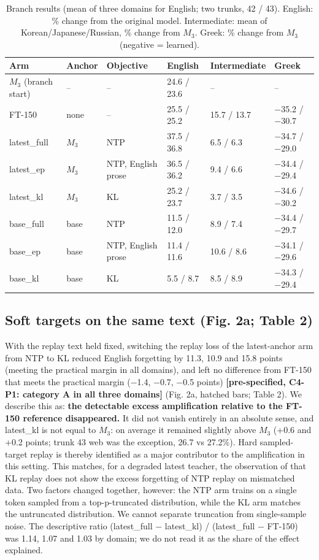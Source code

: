 \documentclass[11pt]{article}
\begin{document}
\begin{table}[t]
\centering
\small
\caption{Branch results (mean of three domains for English; two trunks, 42 / 43). English: \% change from the original model. Intermediate: mean of Korean/Japanese/Russian, \% change from $M_3$. Greek: \% change from $M_3$ (negative = learned).}
\label{tab:2}
\begin{tabular}{llllll}
\toprule
\textbf{Arm} & \textbf{Anchor} & \textbf{Objective} & \textbf{English} & \textbf{Intermediate} & \textbf{Greek} \\
\midrule
$M_3$ (branch start) & – & – & 24.6 / 23.6 & – & – \\
FT-150 & none & – & 25.5 / 25.2 & 15.7 / 13.7 & −35.2 / −30.7 \\
latest\_full & $M_3$ & NTP & 37.5 / 36.8 & 6.5 / 6.3 & −34.7 / −29.0 \\
latest\_ep & $M_3$ & NTP, English prose & 36.5 / 36.2 & 9.4 / 6.6 & −34.4 / −29.4 \\
latest\_kl & $M_3$ & KL & 25.2 / 23.7 & 3.7 / 3.5 & −34.6 / −30.2 \\
base\_full & base & NTP & 11.5 / 12.0 & 8.9 / 7.4 & −34.4 / −29.7 \\
base\_ep & base & NTP, English prose & 11.4 / 11.6 & 10.6 / 8.6 & −34.1 / −29.6 \\
base\_kl & base & KL & 5.5 / 8.7 & 8.5 / 8.9 & −34.3 / −29.4 \\
\bottomrule
\end{tabular}
\end{table}

\subsection{Soft targets on the same text (Fig. 2a; Table 2)}

With the replay text held fixed, switching the replay loss of the latest-anchor arm from NTP to KL reduced English forgetting by 11.3, 10.9 and 15.8 points (meeting the practical margin in all domains), and left no difference from FT-150 that meets the practical margin (−1.4, −0.7, −0.5 points) \textbf{[pre-specified, C4-P1: category A in all three domains]} (Fig. 2a, hatched bars; Table 2). We describe this as: \textbf{the detectable excess amplification relative to the FT-150 reference disappeared.} It did not vanish entirely in an absolute sense, and latest\_kl is not equal to $M_3$: on average it remained slightly above $M_3$ (+0.6 and +0.2 points; trunk 43 web was the exception, 26.7 vs 27.2\%). Hard sampled-target replay is thereby identified as a major contributor to the amplification in this setting. This matches, for a degraded latest teacher, the observation of \citet{marek2026} that KL replay does not show the excess forgetting of NTP replay on mismatched data. Two factors changed together, however: the NTP arm trains on a single token sampled from a top-p-truncated distribution, while the KL arm matches the untruncated distribution. We cannot separate truncation from single-sample noise. The descriptive ratio (latest\_full − latest\_kl) / (latest\_full − FT-150) was 1.14, 1.07 and 1.03 by domain; we do not read it as the share of the effect explained.
\end{document}
